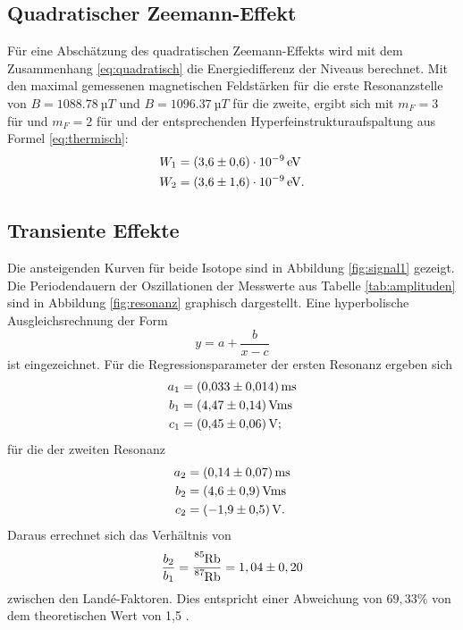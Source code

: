 \subsection{Quadratischer Zeemann-Effekt}
Für eine Abschätzung des quadratischen Zeemann-Effekts wird mit dem Zusammenhang \eqref{eq:quadratisch} die Energiedifferenz der Niveaus berechnet.
Mit den maximal gemessenen magnetischen Feldstärken für die erste Resonanzstelle von $B=\SI{1088,78}{µT}$ und $B=\SI{1096,37}{µT}$ für die zweite, ergibt sich mit $m_F=3$ für  und $m_F=2$ für  und der entsprechenden Hyperfeinstrukturaufspaltung aus Formel \eqref{eq:thermisch}:
\begin{align*}
  W_1&= \SI{3,6 \pm 0,6 e-9}{eV}\\
  W_2&= \SI{3,6 \pm 1,6 e-9}{eV}.
\end{align*}
\subsection{Transiente Effekte}
Die ansteigenden Kurven für beide Isotope sind in Abbildung \ref{fig:signal1} gezeigt. Die Periodendauern der Oszillationen der Messwerte aus Tabelle \ref{tab:amplituden} sind in Abbildung \ref{fig:resonanz} graphisch dargestellt.
Eine hyperbolische Ausgleichsrechnung der Form
\begin{equation}
  y=a+\frac{b}{x-c}
\end{equation}
ist eingezeichnet.
Für die Regressionsparameter der ersten Resonanz ergeben sich
\begin{align*}
  a_1&= \SI{0,033 \pm 0,014}{ms}\\
  b_1&= \SI{4,47 \pm 0,14}{V ms}\\
  c_1&= \SI{0,45 \pm 0,06}{V};
\end{align*}
für die der zweiten Resonanz
\begin{align*}
  a_2&= \SI{0,14 \pm 0,07}{ms}\\
  b_2&= \SI{4,6 \pm 0,9}{V ms}\\
  c_2&= \SI{-1,9 \pm 0,5}{V}.
\end{align*}
Daraus errechnet sich das Verhältnis von
\begin{equation*}
\frac{b_2}{b_1}=\frac{\ce{^{85}Rb}}{\ce{^{87}Rb}}=1,04 \pm 0,20
\end{equation*}
zwischen den Landé-Faktoren.
Dies entspricht einer Abweichung von $69,33\%$ von dem theoretischen Wert von 1,5 \cite{anleitung}.


